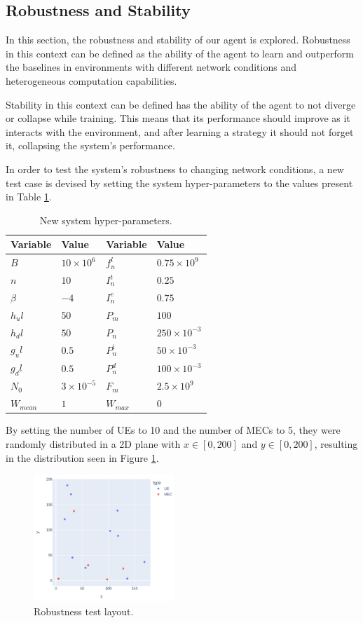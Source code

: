 \documentclass[conference]{IEEEtran}
\begin{document}
\subsection{Robustness and Stability} \label{robustness_stability}

In this section, the robustness and stability of our agent is explored. Robustness in this context can be defined as the ability of the agent to learn and outperform the baselines in environments with different network conditions and heterogeneous computation capabilities. 

Stability in this context can be defined has the ability of the agent to not diverge or collapse while training. This means that its performance should improve as it interacts with the environment, and after learning a strategy it should not forget it, collapsing the system's performance.

In order to test the system's robustness to changing network conditions, a new test case is devised by setting the system hyper-parameters to the values present in Table \ref{new_hyperparams}.

\begin{table}[H]
\centering
\begin{tabular}{|l|l|l|l|}
\hline
Variable             & Value & Variable                & Value \\ \hline
$B$&$10\times10^{6}$&$f_n^l$&$0.75\times10^{9}$\\
$n$&$10$&$I_n^t$&$0.25$\\
$\beta$&$-4$&$I_n^e$&$0.75$\\
$h_ul$&$50$& $P_m$&$100$\\
$h_dl$&$50$& $P_n$& $250\times10^{-3}$\\
$g_ul$&$0.5$&$P_n^i$&$50\times10^{-3}$\\
$g_dl$&$0.5$&$P_n^d$&$100\times10^{-3}$\\
$N_0$&$3\times10^{-5}$&$F_m$&$2.5\times10^{9}$\\
$W_{mean}$&$1$&$W_{max}$&$0$\\ \hline
\end{tabular}
\caption{New system hyper-parameters.}\label{new_hyperparams}
\end{table}

By setting the number of \acrshort{UE}s to 10 and the number of \acrshort{MEC}s to 5, they were randomly distributed in a 2D plane with $x \in [0, 200]$ and $y \in [0, 200]$, resulting in the distribution seen in Figure \ref{robust_test}.

\begin{figure}[H]
  \centering
  \includegraphics[width=200px]{images/5_10_layout.png}
  \caption{Robustness test layout.}  \label{robust_test}
\end{figure}
\end{document}
